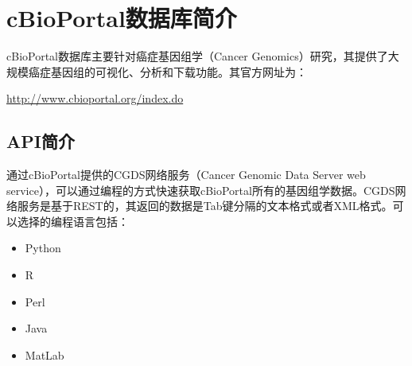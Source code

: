 
\chapter{cBioPortal数据库简介}
cBioPortal数据库主要针对癌症基因组学（Cancer Genomics）研究，其提供了大规模癌症基因组的可视化、分析和下载功能。其官方网址为：
\centerline{\href{http://www.cbioportal.org/index.do}{http://www.cbioportal.org/index.do}}

\section{API简介}
通过cBioPortal提供的CGDS网络服务（Cancer Genomic Data Server web service），可以通过编程的方式快速获取cBioPortal所有的基因组学数据。CGDS网络服务是基于REST的，其返回的数据是Tab键分隔的文本格式或者XML格式。可以选择的编程语言包括：
\begin{itemize}
	\item Python
	\item R
	\item Perl
	\item Java
	\item MatLab
\end{itemize}

